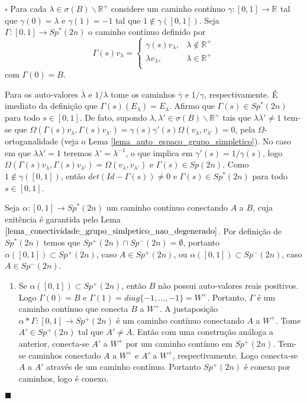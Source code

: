 \documentclass[12pt]{book}
\newenvironment{prova}[1]{$\square$ #1}{\hfill$\blacksquare$}
\newcommand{\complementar}[2]{#1 \backslash #2}
\newcommand{\espectrooperador}[1]{\sigma(#1)}
\newcommand{\formaSimpleticaExtendida}[2]{\Omega(#1, #2)}
\newcommand{\funcaocond}[5]{
	#1 = 
	\left\{
	\begin{array}{cc}
		#2, & #3\\
		#4, & #5\\
	\end{array}
	\right.
}
\newcommand{\gruposimpletico}[1]{Sp(#1)}
\newcommand{\gruposimpleticonaodegenerado}[1]{Sp^{#1}(2n)}
\newcommand{\intervalo}{[0,1]}
\newcommand{\real}[1]{\mathbb{R}^{#1}}
\newcommand{\reta}{\real{}}
\begin{document}
\begin{prova}
		Para cada $\lambda \in \complementar{\espectrooperador{B}}{\real{+}}$ considere um caminho contínuo $\gamma:[0,1]\to \reta$ tal que $\gamma(0) = \lambda$ e $\gamma(1) = -1$ tal que $1 \notin \gamma([0,1])$. Seja $\Gamma:[0,1 ]\to \gruposimpleticonaodegenerado{*}$ o caminho contínuo definido por
		$$
		\funcaocond{\Gamma(s)v_{\lambda}}{\gamma(s)v_{\lambda}}{\lambda \notin \real{+}}{\lambda v_{\lambda} }{\lambda \in \real{+}}
		$$
		com $\Gamma(0) = B$. 
		
		Para os auto-valores $\overline{\lambda}$ e $1/\lambda$ tome os caminhos $\overline{\gamma}$ e $1/\gamma$, respectivamente. É imediato da definição que $\Gamma(s)(E_{\lambda}) = E_{\lambda}$. Afirmo que $\Gamma(s) \in \gruposimpleticonaodegenerado{*}$ para todo $s\in \intervalo$. De fato, supondo $\lambda,\lambda' \in \complementar{\sigma(B)}{\real{+}}$ tais que $\lambda\lambda' \neq 1$ tem-se que $\formaSimpleticaExtendida{\Gamma(s)v_{\lambda}}{\Gamma(s)v_{\lambda'}}= \gamma(s)\gamma'(s)\formaSimpleticaExtendida{v_{\lambda}}{v_{\lambda'}} = 0$, pela $\Omega$-ortoganalidade (veja o Lema \ref{lema_auto_espaco_grupo_simpletico}). No caso em que $\lambda\lambda'=1$ teremos $\lambda'=\lambda^{-1}$, o que implica em $\gamma'(s) = 1/\gamma(s)$, logo $\Omega(\Gamma(s)v_{\lambda},\Gamma(s)v_{\lambda'}) = \Omega(v_{\lambda},v_{\lambda'})$ e $\Gamma(s) \in \gruposimpletico{2n}$. Como $1 \notin \gamma(\intervalo)$, então $det(Id - \Gamma(s))\neq 0 $ e $\Gamma(s)\in \gruposimpleticonaodegenerado{*}$ para todo $s\in \intervalo$.
		
		Seja $\alpha:\intervalo\to \gruposimpleticonaodegenerado{*}$ um caminho contínuo conectando $A$ a $B$, cuja exitência é garantida pelo Lema $\ref{lema_conectividade_grupo_simlpetico_nao_degenerado}$.
		Por definição de $\gruposimpleticonaodegenerado{*}$ temos que $\gruposimpleticonaodegenerado{+} \cap \gruposimpleticonaodegenerado{-}=\emptyset$, portanto $\alpha([0,1]) \subset \gruposimpleticonaodegenerado{+}$, caso $A \in \gruposimpleticonaodegenerado{+}$, ou $\alpha([0,1]) \subset \gruposimpleticonaodegenerado{-}$, caso $A\in \gruposimpleticonaodegenerado{-}$.
		
		\begin{enumerate}
			\item Se $\alpha([0,1]) \subset \gruposimpleticonaodegenerado{+}$, então $B$ não possui auto-valores reais positivos. Logo $\Gamma(0) = B$ e $\Gamma(1) = diag \{-1, \dots, -1\} = W^{+}$. Portanto, $\Gamma$ é um caminho contínuo que conecta $B$ a $W^{+}$. A justaposição $\alpha * \Gamma:\intervalo \to \gruposimpleticonaodegenerado{+}$
			é um caminho contínuo conectando $A$ a $W^{+}$. Tome $A' \in \gruposimpleticonaodegenerado{+}$ tal que $A'\neq A$. Então com uma construção análoga a anterior, conecta-se $A'$ a $W^{+}$ por um caminho contínuo em $\gruposimpleticonaodegenerado{+}$. Tem-se caminhos conectado $A$ a $W^{+}$ e $A'$ a $W^{+}$, respectivamente. Logo conecta-se $A$ a $A'$ através de um caminho contínuo. Portanto $\gruposimpleticonaodegenerado{+}$ é conexo por caminhos, logo é conexo.
			

\end{enumerate}
\end{prova}
\end{document}
